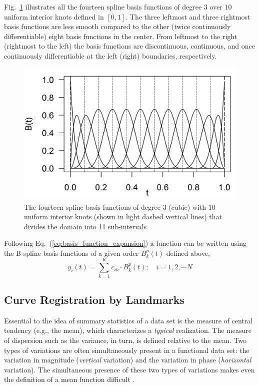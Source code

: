 Fig.~\ref{fig:b_spline} illustrates all the fourteen spline basis functions of degree $3$ over $10$ uniform interior knots defined in $[0,1]$.
The three leftmost and three rightmost basis functions are less smooth compared to the other (twice continuously differentiable) eight basis functions in the center. 
From leftmost to the right (rightmost to the left) the basis functions are discontinuous, continuous, and once continuously differentiable at the left (right) boundaries, respectively.
\begin{figure}[bth]
	\centering
	\includegraphics[scale=0.85,trim={0 0.15cm 0 0},clip]{../figures/r-figures/bSpline.png}
	\caption[Spline basis functions of order $4$]{The fourteen spline basis functions of degree $3$ (cubic) with $10$ uniform interior knots (shown in light dashed vertical lines) that divides the domain into 11 sub-intervals}
	\label{fig:b_spline}
\end{figure}

Following Eq.~(\ref{eq:basis_function_expansion}) a function can be written using the B-spline basis functions of a given order $B_k^p (t)$ defined above,
\begin{equation}
	y_i (t) = \sum_{k = 1}^{K} c_{ik} \cdot B^p_k (t); \quad i = 1, 2, \cdots N
\label{eq:basis_function_expansion}
\end{equation}

\subsection{Curve Registration by Landmarks}\label{sub:sa_registration}

Essential to the idea of summary statistics of a data set is the measure of central tendency (e.g., the mean), which characterizes a \emph{typical} realization.
The measure of dispersion such as the variance, in turn, is defined relative to the mean. 
Two types of variations are often simultaneously present in a functional data set: 
the variation in magnitude (\emph{vertical} variation) and the variation in phase (\emph{horizontal} variation).
The simultaneous presence of these two types of variations makes even the definition of a mean function difficult \cite{Kneip1992}.

